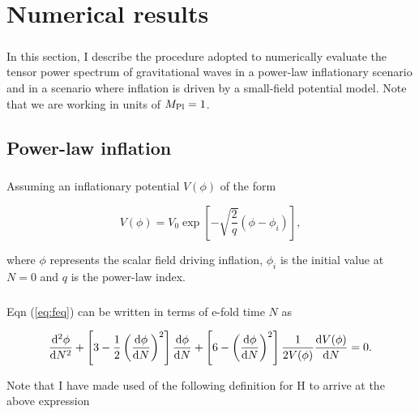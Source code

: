 \documentclass[12pt,a4paper,oneside]{book}
\begin{document}

\chapter{Numerical results}

\paragraph{} In this section, I describe the procedure adopted to numerically evaluate the tensor power spectrum of gravitational waves in a power-law inflationary scenario and in a scenario where inflation is driven by a small-field potential model. Note that we are working in units of $M_{\rm Pl} = 1$.

\section{Power-law inflation}

\paragraph{} Assuming an inflationary potential $V(\phi)$ of the form

\begin{equation}
V(\phi) = V_0 \exp\left[-\sqrt{\frac{2}{q}}\left(\phi - \phi_i\right)\right],
\end{equation}

\noindent where $\phi$ represents the scalar field driving inflation, $\phi_i$ is the initial value at $N=0$ and $q$ is the power-law index.

\paragraph*{} Eqn (\ref{eq:feq}) can be written in terms of e-fold time $N$ as

\begin{equation}\label{eq:temp}
\frac{{\rm d}^2\phi}{{\rm d}N^2} + \left[3 - \frac{1}{2}\left(\frac{{\rm d}\phi}{{\rm d}N}\right)^2\right]\frac{{\rm d}\phi}{{\rm d}N} + \left[6 - \left(\frac{{\rm d}\phi}{{\rm d}N}\right)^2\right]\frac{1}{2V(\phi)}\frac{{\rm d}V(\phi)}{{\rm d}N} = 0.
\end{equation}

\noindent Note that I have made used of the following definition for H to arrive at the above expression
\end{document}
